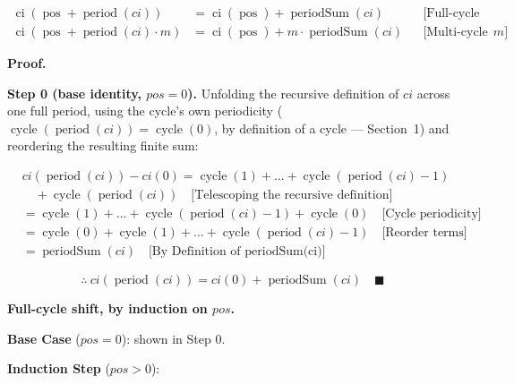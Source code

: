 \begin{equation*}
\begin{aligned}
\operatorname{ci}(\operatorname{pos} + \operatorname{period}(ci)) &= \operatorname{ci}(\operatorname{pos}) + \operatorname{periodSum}(ci)
  && \text{[Full-cycle shift]} \\
\operatorname{ci}(\operatorname{pos} + \operatorname{period}(ci) \cdot m) &= \operatorname{ci}(\operatorname{pos}) + m \cdot \operatorname{periodSum}(ci)
  && \text{[Multi-cycle shift, by induction on } m \text{]}
\end{aligned}
\end{equation*}

\textbf{Proof.}

\textbf{Step 0 (base identity, $pos = 0$).} Unfolding the recursive
definition of $ci$ across one full period, using the cycle's own periodicity
($\operatorname{cycle}(\operatorname{period}(ci)) = \operatorname{cycle}(0)$,
by definition of a cycle --- Section~1) and reordering the resulting finite
sum:

\begin{equation*}
\begin{aligned}
& ci(\operatorname{period}(ci)) - ci(0)
  = \operatorname{cycle}(1) + \dots + \operatorname{cycle}(\operatorname{period}(ci) - 1) \\
&\quad + \operatorname{cycle}(\operatorname{period}(ci))
  \quad \text{[Telescoping the recursive definition]} \\
&= \operatorname{cycle}(1) + \dots + \operatorname{cycle}(\operatorname{period}(ci) - 1) + \operatorname{cycle}(0)
  \quad \text{[Cycle periodicity]} \\
&= \operatorname{cycle}(0) + \operatorname{cycle}(1) + \dots + \operatorname{cycle}(\operatorname{period}(ci) - 1)
  \quad \text{[Reorder terms]} \\
&= \operatorname{periodSum}(ci)
  \quad \text{[By Definition of periodSum(ci)]}
\end{aligned}
\end{equation*}

\begin{equation*}
\therefore \ ci(\operatorname{period}(ci)) = ci(0) + \operatorname{periodSum}(ci) \quad \blacksquare
\end{equation*}

\textbf{Full-cycle shift, by induction on $pos$.}

\textbf{Base Case} ($pos = 0$): shown in Step 0.

\textbf{Induction Step} ($pos > 0$):

